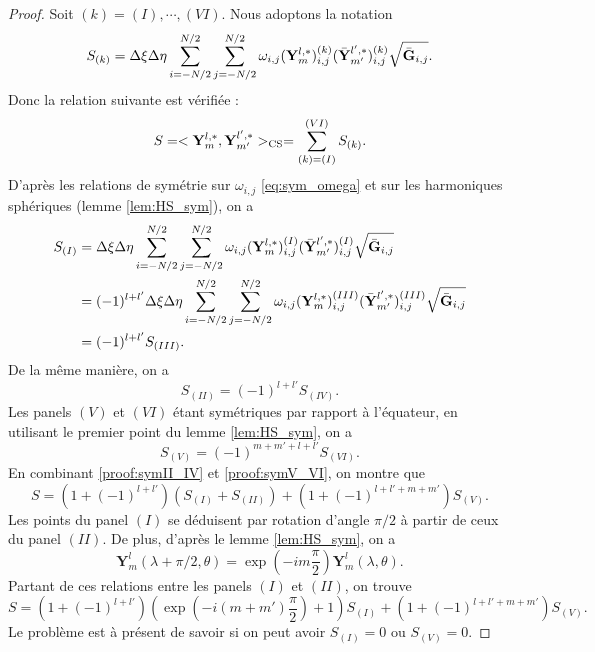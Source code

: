 \begin{proof}
Soit $(k) = (I) , \cdots, (VI)$. Nous adoptons la notation
\begin{equation}
S_{(k)} = \Delta \xi \Delta \eta \displaystyle\sum\limits_{i=-N/2}^{N/2} \displaystyle\sum\limits_{j=-N/2}^{N/2} \omega_{i,j} (\mathbf{Y}_m^{l,*})_{i,j}^{(k)} (\bar{\mathbf{Y}}_{m'}^{l',*})_{i,j}^{(k)} \sqrt{\bar{\mathbf{G}}_{i,j}}.
\end{equation}
Donc la relation suivante est vérifiée :
\begin{equation}
S = <\mathbf{Y}_{m}^{l,*},\mathbf{Y}_{m'}^{l',*}>_{\text{CS}} = \displaystyle\sum\limits_{(k)=(I)}^{(VI)} S_{(k)}.
\end{equation}
D'après les relations de symétrie sur $\omega_{i,j}$ \eqref{eq:sym_omega} et sur les harmoniques sphériques (lemme \ref{lem:HS_sym}), on a
\begin{align*}
S_{(I)} & = \Delta \xi \Delta \eta \displaystyle\sum\limits_{i=-N/2}^{N/2} \displaystyle\sum\limits_{j=-N/2}^{N/2} \omega_{i,j} (\mathbf{Y}_m^{l,*})_{i,j}^{(I)} (\bar{\mathbf{Y}}_{m'}^{l',*})_{i,j}^{(I)} \sqrt{\bar{\mathbf{G}}_{i,j}} \\
	& = (-1)^{l+l'} \Delta \xi \Delta \eta \displaystyle\sum\limits_{i=-N/2}^{N/2} \displaystyle\sum\limits_{j=-N/2}^{N/2} \omega_{i,j} (\mathbf{Y}_m^{l,*})_{i,j}^{(III)} (\bar{\mathbf{Y}}_{m'}^{l',*})_{i,j}^{(III)} \sqrt{\bar{\mathbf{G}}_{i,j}} \\
	& = (-1)^{l+l'}S_{(III)}.
\end{align*}
De la même manière, on a
\begin{equation}
S_{(II)} = (-1)^{l+l'}S_{(IV)}.
\label{proof:symII_IV}
\end{equation}
Les panels $(V)$ et $(VI)$ étant symétriques par rapport à l'équateur, en utilisant le premier point du lemme \ref{lem:HS_sym}, on a
\begin{equation}
S_{(V)} = (-1)^{m+m'+l+l'} S_{(VI)}.
\label{proof:symV_VI}
\end{equation}
En combinant \eqref{proof:symII_IV} et \eqref{proof:symV_VI}, on montre que
\begin{equation}
S=(1+(-1)^{l+l'})(S_{(I)} + S_{(II)}) + (1+(-1)^{l+l'+m+m'})S_{(V)}.
\end{equation}
Les points du panel $(I)$ se déduisent par rotation d'angle $\pi/2$ à partir de ceux du panel $(II)$. De plus, d'après le lemme \ref{lem:HS_sym}, on a
\begin{equation}
\mathbf{Y}^{l}_m(\lambda + \pi/2, \theta) = \exp \left( - i m \dfrac{\pi}{2}  \right) \mathbf{Y}^{l}_m(\lambda, \theta).
\end{equation}
Partant de ces relations entre les panels $(I)$ et $(II)$, on trouve
\begin{equation}
S = (1+(-1)^{l+l'})\left( \exp \left( -i(m+m') \dfrac{\pi}{2} \right) +1 \right)S_{(I)} + (1+(-1)^{l+l'+m+m'})S_{(V)}.
\end{equation}
Le problème est à présent de savoir si on peut avoir $S_{(I)}=0$ ou $S_{(V)} = 0$.


\end{proof}
